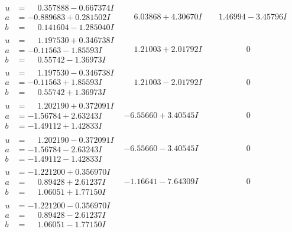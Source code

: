 \documentclass[1p]{elsarticle_modified}
\theoremstyle{definition}
\begin{document}
$$\begin{array}{c|c|c}
\begin{aligned}
u &= \phantom{-}0.357888 - 0.667374 I \\
a &= -0.889683 + 0.281502 I \\
b &= \phantom{-}0.141604 - 1.285040 I\end{aligned}
 & \phantom{-}6.03868 + 4.30670 I & \phantom{-}1.46994 - 3.45796 I \\ \hline\begin{aligned}
u &= \phantom{-}1.197530 + 0.346738 I \\
a &= -0.11563 - 1.85593 I \\
b &= \phantom{-}0.55742 - 1.36973 I\end{aligned}
 & \phantom{-}1.21003 + 2.01792 I & \phantom{-0.000000 } 0 \\ \hline\begin{aligned}
u &= \phantom{-}1.197530 - 0.346738 I \\
a &= -0.11563 + 1.85593 I \\
b &= \phantom{-}0.55742 + 1.36973 I\end{aligned}
 & \phantom{-}1.21003 - 2.01792 I & \phantom{-0.000000 } 0 \\ \hline\begin{aligned}
u &= \phantom{-}1.202190 + 0.372091 I \\
a &= -1.56784 + 2.63243 I \\
b &= -1.49112 + 1.42833 I\end{aligned}
 & -6.55660 + 3.40545 I & \phantom{-0.000000 } 0 \\ \hline\begin{aligned}
u &= \phantom{-}1.202190 - 0.372091 I \\
a &= -1.56784 - 2.63243 I \\
b &= -1.49112 - 1.42833 I\end{aligned}
 & -6.55660 - 3.40545 I & \phantom{-0.000000 } 0 \\ \hline\begin{aligned}
u &= -1.221200 + 0.356970 I \\
a &= \phantom{-}0.89428 + 2.61237 I \\
b &= \phantom{-}1.06051 + 1.77150 I\end{aligned}
 & -1.16641 - 7.64309 I & \phantom{-0.000000 } 0 \\ \hline\begin{aligned}
u &= -1.221200 - 0.356970 I \\
a &= \phantom{-}0.89428 - 2.61237 I \\
b &= \phantom{-}1.06051 - 1.77150 I\end{aligned}

\end{array}$$
\end{document}
